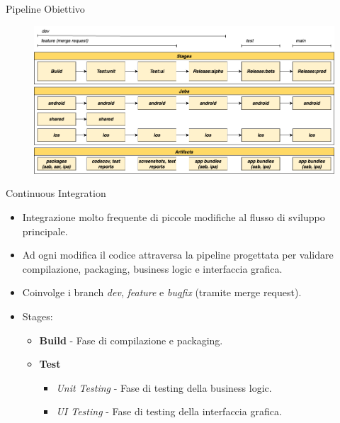     \begin{frame}{Pipeline Obiettivo}
        \begin{figure}[H]
            \centering
            \includegraphics[width=1\textwidth]{img/tesi-2-Page-12.drawio.png}
        \end{figure}  
    \end{frame}

    \begin{frame}{Continuous Integration}
    \begin{itemize}
        \item Integrazione molto frequente di piccole modifiche al flusso di sviluppo principale.
        \item Ad ogni modifica il codice attraversa la pipeline progettata per validare compilazione, packaging, business logic e interfaccia grafica.
        \item Coinvolge i branch \textit{dev}, \textit{feature} e \textit{bugfix} (tramite merge request).
        \item Stages:
            \begin{itemize}
                \item \textbf{Build} - Fase di compilazione e packaging.
                \item \textbf{Test}
                \begin{itemize}
                    \item \textit{Unit Testing} - Fase di testing della business logic.
                    \item \textit{UI Testing} - Fase di testing della interfaccia grafica.
                \end{itemize}
            \end{itemize}
        \end{itemize}
    \end{frame}

